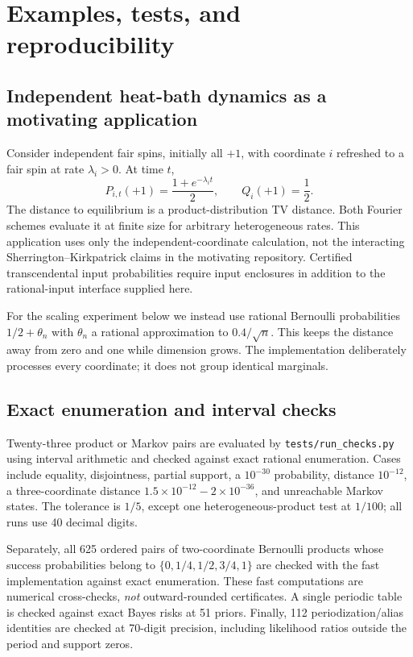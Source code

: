 \documentclass[11pt]{article}
\theoremstyle{definition}
\theoremstyle{remark}
\begin{document}
\section{Examples, tests, and reproducibility}
\label{sec:experiments}

\subsection{Independent heat-bath dynamics as a motivating application}

Consider independent fair spins, initially all $+1$, with coordinate $i$ refreshed to a fair spin at rate $\lambda_i>0$. At time $t$,
\[
 P_{i,t}(+1)=\frac{1+e^{-\lambda_i t}}2,\qquad Q_i(+1)=\frac12.
\]
The distance to equilibrium is a product-distribution TV distance. Both Fourier schemes evaluate it at finite size for arbitrary heterogeneous rates. This application uses only the independent-coordinate calculation, not the interacting Sherrington--Kirkpatrick claims in the motivating repository. Certified transcendental input probabilities require input enclosures in addition to the rational-input interface supplied here.

For the scaling experiment below we instead use rational Bernoulli probabilities $1/2+\theta_n$ with $\theta_n$ a rational approximation to $0.4/\sqrt n$. This keeps the distance away from zero and one while dimension grows. The implementation deliberately processes every coordinate; it does not group identical marginals.

\subsection{Exact enumeration and interval checks}

Twenty-three product or Markov pairs are evaluated by \texttt{tests/run\_checks.py} using interval arithmetic and checked against exact rational enumeration. Cases include equality, disjointness, partial support, a $10^{-30}$ probability, distance $10^{-12}$, a three-coordinate distance $1.5\times10^{-12}-2\times10^{-36}$, and unreachable Markov states. The tolerance is $1/5$, except one heterogeneous-product test at $1/100$; all runs use 40 decimal digits.

Separately, all 625 ordered pairs of two-coordinate Bernoulli products whose success probabilities belong to $\{0,1/4,1/2,3/4,1\}$ are checked with the fast implementation against exact enumeration. These fast computations are numerical cross-checks, \emph{not} outward-rounded certificates. A single periodic table is checked against exact Bayes risks at 51 priors. Finally, 112 periodization/alias identities are checked at 70-digit precision, including likelihood ratios outside the period and support zeros.
\end{document}
